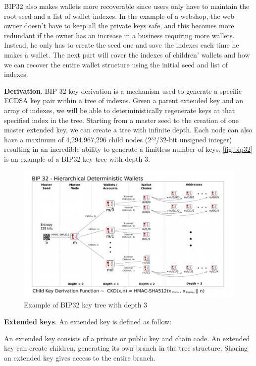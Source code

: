 BIP32 also makes wallets more recoverable since users only have to maintain the root seed and a list of wallet indexes. In the example of a webshop, the web owner doesn’t have to keep all the private keys safe, and this becomes more redundant if the owner has an increase in a business requiring more wallets. Instead, he only has to create the seed one and save the indexes each time he makes a wallet. The next part will cover the indexes of children’ wallets and how we can recover the entire wallet structure using the initial seed and list of indexes.

\bigskip
{\textbf{Derivation}}. BIP 32 key derivation is a mechanism used to generate a specific ECDSA key pair within a tree of indexes. Given a parent extended key and an array of indexes, we will be able to deterministically regenerate keys at that specified index in the tree. Starting from a master seed to the creation of one master extended key, we can create a tree with infinite depth. Each node can also have a maximum of 4,294,967,296 child nodes (2³²/32-bit unsigned integer) resulting in an incredible ability to generate a limitless number of keys. \autoref{fig:bip32} is an example of a BIP32 key tree with depth 3.

\begin{figure}[ht!]
    \centering
    \includegraphics[width=1\textwidth]{images/bip32.png}
    \caption[Example of BIP32 key tree with depth 3]{Example of BIP32 key tree with depth 3 \cite{github/bip0032}}
    \label{fig:bip32}
\end{figure}


\bigskip
{\textbf{Extended keys}}. An extended key is defined as follow:

\begin{adjustwidth}{2cm}{}
    An extended key consists of a private or public key and chain code. An extended key can create children, generating its own branch in the tree structure. Sharing an extended key gives access to the entire branch.
\end{adjustwidth}

